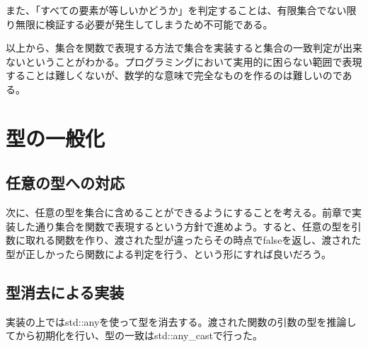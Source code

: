\documentclass[a4paper,11pt]{ltjsarticle}
\begin{document}
また、「すべての要素が等しいかどうか」を判定することは、有限集合でない限り無限に検証する必要が発生してしまうため不可能である。

以上から、集合を関数で表現する方法で集合を実装すると集合の一致判定が出来ないということがわかる。プログラミングにおいて実用的に困らない範囲で表現することは難しくないが、数学的な意味で完全なものを作るのは難しいのである。

\section{型の一般化}
\subsection{任意の型への対応}
次に、任意の型を集合に含めることができるようにすることを考える。前章で実装した通り集合を関数で表現するという方針で進めよう。すると、任意の型を引数に取れる関数を作り、渡された型が違ったらその時点でfalseを返し、渡された型が正しかったら関数による判定を行う、という形にすれば良いだろう。
\subsection{型消去による実装}
実装の上ではstd::anyを使って型を消去する。渡された関数の引数の型を推論してから初期化を行い、型の一致はstd::any\_castで行った。
\end{document}

